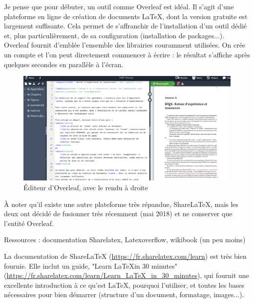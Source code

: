 Je pense que pour débuter, un outil comme Overleaf est idéal. Il s'agit d'une plateforme en ligne de création de documents \LaTeX , dont la version gratuite est largement suffisante.
Cela permet de s'affranchir de l'installation d'un outil dédié et, plus particulièrement, de sa configuration (installation de packages...). Overleaf fournit d'emblée l'ensemble des librairies couramment utilisées.
On crée un compte et l'on peut directement commencer à écrire : le résultat s'affiche après quelques secondes en parallèle à l'écran.

\begin{figure}[]
    \centering
    \includegraphics[width=\linewidth]{Figures/overleaf-editor.png}
    \caption{Éditeur d'Overleaf, avec le rendu à droite}
    \label{fig:overleaf-editor}
\end{figure}

À noter qu'il existe une autre plateforme très répandue, ShareLaTeX, mais les deux ont décidé de fusionner très récemment (mai 2018) et ne conserver que l'entité Overleaf.


Ressources : documentation Sharelatex, Latexoverflow, wikibook (un peu moins)

La documentation de ShareLaTeX (\url{https://fr.sharelatex.com/learn}) est très bien fournie. Elle inclut un guide, "Learn \LaTeX in 30 minutes" (\url{https://fr.sharelatex.com/learn/Learn_LaTeX_in_30_minutes}), qui fournit une excellente introduction à ce qu'est \LaTeX, pourquoi l'utiliser, et toutes les bases nécessaires pour bien démarrer (structure d'un document, formatage, images...).
